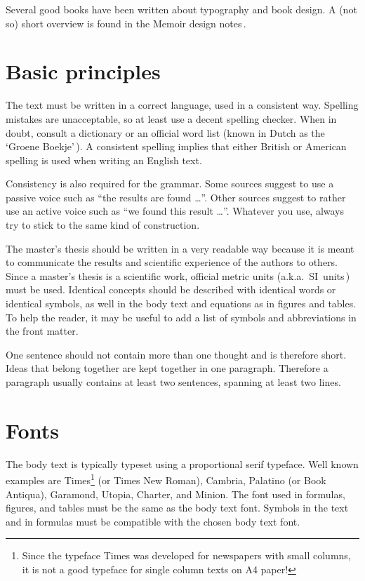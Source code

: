 \documentclass[11pt,article,oneside,british,extralanguage=dutch]{kulemt}
\newcommand\Dutch[1]{`{\selectlanguage{dutch}#1}'}
\begin{document}
Several good books have been written about typography and book design. A
(not so) short overview is found in the Memoir design notes\,\cite{memdesign}.

\section{Basic principles}
The text must be written in a correct language, used in a consistent way.
Spelling mistakes are unacceptable, so at least use a decent spelling
checker. When in doubt, consult a dictionary or an official word list
(known in Dutch as the \Dutch{Groene Boekje}\,\cite{grboek}). A consistent
spelling implies that either British or American spelling is used when
writing an English text.

Consistency is also required for the grammar. Some sources suggest to use a
passive voice such as ``the results are found \ldots''. Other sources
suggest to rather use an active voice such as ``we found this result
\ldots''. Whatever you use, always try to stick to the same kind of
construction.

The master's thesis should be written in a very readable way because it is
meant to communicate the results and scientific experience of the authors
to others.
Since a master's thesis is a scientific work, official metric units (a.k.a.\
SI~units\,\cite{siunits}) must be used.
Identical concepts should be described with identical words or identical
symbols, as well in the body text and equations as in figures and tables.
To help the reader, it may be useful to add a list of symbols and
abbreviations in the front matter.

One sentence should not contain more than one thought and is
therefore short. Ideas that belong together are kept together in one
paragraph. Therefore a paragraph usually contains at least two sentences,
spanning at least two lines.

\section{Fonts}
The body text is typically typeset using a proportional serif typeface. Well
known examples are Times\footnote{Since the typeface Times was developed for
  newspapers with small columns, it is not a good typeface for single column
  texts on A4 paper!} (or Times New Roman), Cambria, Palatino (or Book
Antiqua), Garamond, Utopia, Charter, and Minion. The font used in formulas,
figures, and tables must be the same as the body text font. Symbols in the text
and in formulas must be compatible with the chosen body text font.
\end{document}
